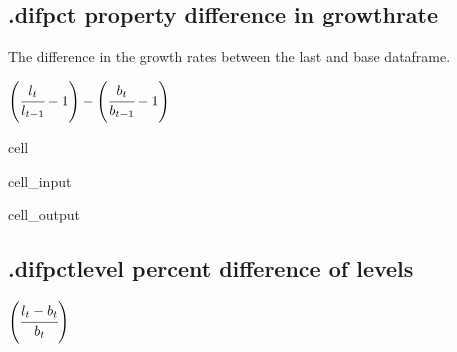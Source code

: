\documentclass[letterpaper,10pt,english]{jupyterBook}
\begin{document}
\subsection{.difpct property difference in growthrate}
\label{\detokenize{content/Python/modelflow_features:difpct-property-difference-in-growthrate}}
\sphinxAtStartPar
The difference in the growth rates  between the last and base dataframe.

\sphinxAtStartPar
\(\left( \cfrac{l_t}{l_{t-1}}-1 \right) - \left(\cfrac{b_t}{b_{t-1}}-1 \right)\)

\begin{sphinxuseclass}{cell}\begin{sphinxVerbatimInput}

\begin{sphinxuseclass}{cell_input}
\begin{sphinxVerbatim}[commandchars=\\\{\}]
\PYG{p}{[}\PYG{p}{]}  
\end{sphinxVerbatim}

\end{sphinxuseclass}\end{sphinxVerbatimInput}
\begin{sphinxVerbatimOutput}

\begin{sphinxuseclass}{cell_output}
\noindent{}

\end{sphinxuseclass}\end{sphinxVerbatimOutput}

\end{sphinxuseclass}

\subsection{.difpctlevel percent difference of  levels}
\label{\detokenize{content/Python/modelflow_features:difpctlevel-percent-difference-of-levels}}
\sphinxAtStartPar
\(\left( \cfrac{l_t-b_t}{b_{t}} \right) \)
\end{document}
